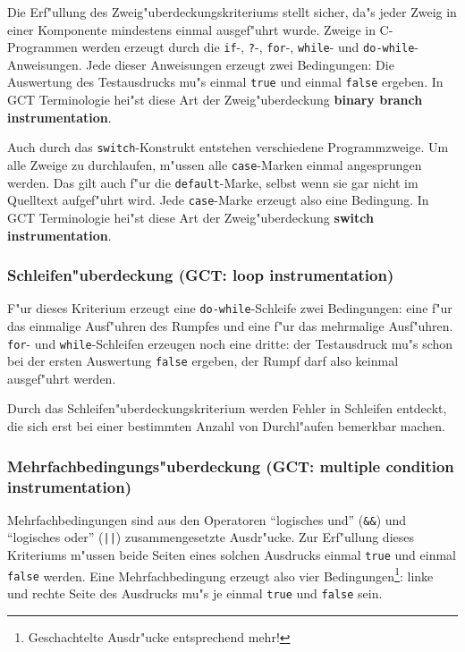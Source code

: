 Die Erf"ullung des Zweig"uberdeckungskriteriums stellt sicher, da"s jeder
Zweig in einer Komponente mindestens einmal ausgef"uhrt wurde. Zweige in
C-Programmen werden erzeugt durch die {\tt {if}}-, {\tt {?}}-, {\tt {for}}-,
{\tt {while}}- und {\tt {do-while}}-Anweisungen. Jede dieser Anweisungen
erzeugt zwei Bedingungen: Die Auswertung des Testausdrucks mu"s einmal
{\tt {true}} und einmal {\tt {false}} ergeben. In GCT Terminologie
hei"st diese Art der Zweig"uberdeckung {\bf binary branch instrumentation}.


Auch durch das {\tt {switch}}-Konstrukt entstehen verschiedene Programmzweige.
Um alle Zweige zu durchlaufen, m"ussen alle {\tt {case}}-Marken einmal
angesprungen werden. Das gilt auch f"ur die {\tt {default}}-Marke, selbst
wenn sie gar nicht im Quelltext aufgef"uhrt wird. Jede {\tt {case}}-Marke
erzeugt also eine Bedingung. In GCT Terminologie
hei"st diese Art der Zweig"uberdeckung {\bf switch instrumentation}.


\subsubsection*{Schleifen"uberdeckung (GCT: loop instrumentation)}

F"ur dieses Kriterium erzeugt eine {\tt {do-while}}-Schleife zwei Bedingungen:
eine f"ur das einmalige Ausf"uhren des Rumpfes und eine f"ur das mehrmalige
Ausf"uhren. {\tt {for}}- und {\tt {while}}-Schleifen erzeugen noch eine
dritte: der Testausdruck mu"s schon bei der ersten Auswertung {\tt {false}}
ergeben, der Rumpf darf also keinmal ausgef"uhrt werden.

Durch das Schleifen"uberdeckungskriterium werden Fehler in
Schleifen entdeckt, die sich erst bei einer bestimmten Anzahl von Durchl"aufen
bemerkbar machen.


\subsubsection*{Mehrfachbedingungs"uberdeckung (GCT: multiple condition 
instrumentation)}

Mehrfachbedingungen sind aus den Operatoren "`logisches und"' ({\tt {\&\&}}) und
"`logisches oder"' ({\tt {||}}) zusammengesetzte Ausdr"ucke. Zur Erf"ullung
dieses Kriteriums m"ussen beide Seiten eines solchen Ausdrucks einmal
{\tt {true}} und einmal {\tt {false}} werden. Eine Mehrfachbedingung erzeugt
also vier Bedingungen{\footnote{Geschachtelte Ausdr"ucke entsprechend mehr!}}:
linke und rechte Seite des Ausdrucks mu"s je einmal {\tt {true}}
und {\tt {false}} sein.

